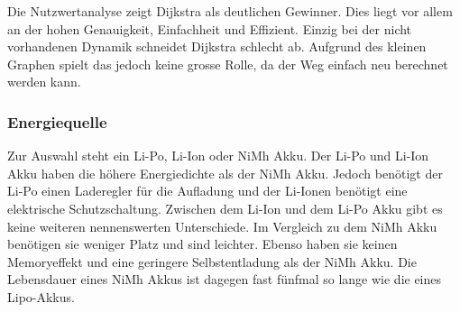 \documentclass[../main.tex]{subfiles}
\begin{document}
Die Nutzwertanalyse zeigt Dijkstra als deutlichen Gewinner. Dies liegt vor allem an der hohen Genauigkeit, Einfachheit und Effizient. Einzig bei der nicht vorhandenen Dynamik schneidet Dijkstra schlecht ab. Aufgrund des kleinen Graphen spielt das jedoch keine grosse Rolle, da der Weg einfach neu berechnet werden kann.

\subsubsection{Energiequelle}
\label{a3:Energiequelle}
Zur Auswahl steht ein Li-Po, Li-Ion oder NiMh Akku. Der Li-Po und Li-Ion Akku haben die höhere Energiedichte als der NiMh Akku. Jedoch benötigt der Li-Po einen Laderegler für die Aufladung und der Li-Ionen benötigt eine elektrische Schutzschaltung. Zwischen dem Li-Ion und dem Li-Po Akku gibt es keine weiteren nennenswerten Unterschiede. 
Im Vergleich zu dem NiMh Akku benötigen sie weniger Platz und sind leichter. Ebenso haben sie keinen Memoryeffekt und eine geringere Selbstentladung als der NiMh Akku. Die Lebensdauer eines NiMh Akkus ist dagegen fast fünfmal so lange wie die eines Lipo-Akkus.\footnotemark
{}


\begin{table}[H]
            \caption{Nutzwertanalyse Akku}
            \label{tab:konzept_Akku}
        \end{table}
        
\end{document}
